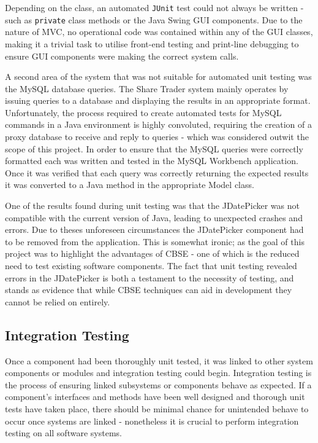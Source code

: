 \documentclass[12pt, a4paper,titlepage]{article}
\begin{document}
Depending on the class, an automated {\tt JUnit} test could not always be
written - such as {\tt private} class methods or the Java Swing GUI components. 
Due to the nature of MVC, no operational code was contained within any of the
GUI classes, making it a trivial task to utilise front-end testing and
print-line debugging to ensure GUI components were making the correct system
calls.

A second area of the system that was not suitable for automated unit testing
was the MySQL database queries. 
The Share Trader system mainly operates by issuing queries to a database and
displaying the results in an appropriate format. 
Unfortunately, the process required to create automated tests for
MySQL commands in a Java environment is highly convoluted, requiring the
creation of a proxy database to receive and reply to queries - which was
considered outwit the scope of this project. 
In order to ensure that the MySQL queries were correctly formatted each was
written and tested in the MySQL Workbench application. 
Once it was verified that each query was correctly returning the expected
results it was converted to a Java method in the appropriate Model class.

One of the results  found during  unit testing was that the JDatePicker was
not compatible with the current version of Java, leading to unexpected crashes
and errors.
Due to theses unforeseen circumstances the JDatePicker component had to be
removed from the application.
This is somewhat ironic; as the goal of this project was to highlight the
advantages of CBSE - one of which is the reduced need to test existing
software components.
The fact that unit testing revealed errors in the JDatePicker is both a
testament to the necessity of testing, and stands as evidence that while CBSE
techniques can aid in development they cannot be relied on entirely.

\subsection{Integration Testing}
Once a component had been thoroughly unit tested, it was linked to other
system components or modules and integration testing could begin. 
Integration testing is the process of ensuring linked subsystems or components
behave as expected.
If a component's interfaces and methods have been well designed and
thorough unit tests have taken place, there should be minimal chance for
unintended behave to occur once systems are linked - nonetheless it is crucial
to perform integration testing on all software systems.  
\end{document}
